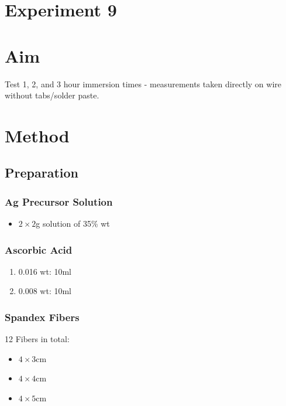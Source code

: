 \documentclass{article}
\begin{document}
\section*{Experiment 9}

\section{Aim}
Test 1, 2, and 3 hour immersion times - measurements taken directly on wire without tabs/solder paste.

\section{Method}
\subsection{Preparation}
\subsubsection{Ag Precursor Solution}
\begin{itemize}
    \item  $2 \times 2$g solution of  35\% wt
\end{itemize}

\subsubsection{Ascorbic Acid}
\begin{enumerate}
    \item 0.016 wt: 10ml
    \item 0.008 wt: 10ml
\end{enumerate}

\subsubsection{Spandex Fibers}
12 Fibers in total:
\begin{itemize}
    \item $4\times 3$cm
    \item $4\times 4$cm
    \item $4\times 5$cm
\end{itemize}
\end{document}
